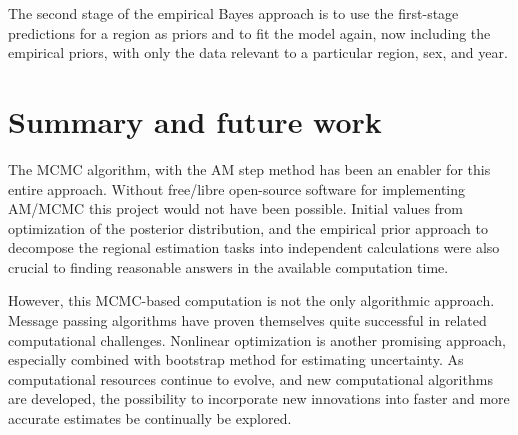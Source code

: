 The second stage of the empirical Bayes approach is to use the
first-stage predictions for a region as priors and to fit the model again,
now including the empirical priors, with only the data relevant to a
particular region, sex, and year.


\section{Summary and future work}

The MCMC algorithm, with the AM step method has been an enabler for
this entire approach.  Without free/libre open-source software for
implementing AM/MCMC\cite{patil_pymc:_2010} this project would not
have been possible.  Initial values from optimization of the posterior
distribution, and the empirical prior approach to decompose the
regional estimation tasks into independent calculations were also
crucial to finding reasonable answers in the available computation
time.

However, this MCMC-based computation is not the only algorithmic
approach.  Message passing algorithms have proven themselves quite
successful in related computational
challenges.\cite{yedidia_generalized_2000, braunstein_survey_2005}
Nonlinear optimization is another promising approach, especially
combined with bootstrap method for estimating
uncertainty.\cite{bell_robust_????} As computational resources
continue to evolve, and new computational algorithms are developed,
the possibility to incorporate new innovations into faster and more
accurate estimates be continually be explored.

